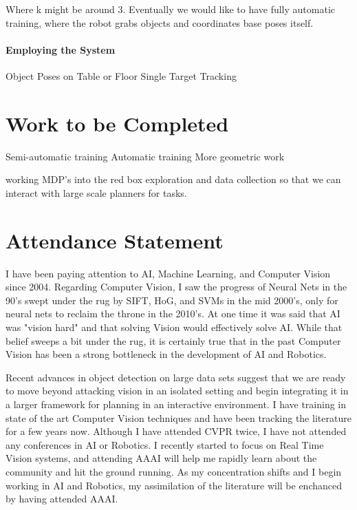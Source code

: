 \documentclass[12pt]{article}
\numberwithin{equation}{section}
\numberwithin{table}{section}
\numberwithin{figure}{section}
\begin{document}
Where k might be around 3. Eventually we would like to have fully automatic training, where the
robot grabs objects and coordinates base poses itself.

\paragraph{Employing the System}
Object Poses on Table or Floor
Single Target Tracking

\section{Work to be Completed}
Semi-automatic training
Automatic training
More geometric work

working MDP's into the red box exploration and data collection so that we can interact with
large scale planners for tasks.


%
%

\newpage

\section{Attendance Statement}
  I have been paying attention to AI, Machine Learning, and Computer Vision since 2004. 
Regarding Computer Vision, I saw the progress of Neural Nets in the 90's swept under 
the rug by SIFT, HoG, and SVMs in the mid 2000's, only for neural nets to reclaim the throne in the 2010's.
At one time it was said that AI was "vision hard" and that solving Vision would
effectively solve AI. While that belief sweeps a bit under the rug, it is certainly true
that in the past Computer Vision has been a strong bottleneck in the development of AI and 
Robotics. 
  
  Recent advances in object detection on large data sets suggest that we are ready
to move beyond attacking vision in an isolated setting and begin integrating it in a
larger framework for planning in an interactive environment. I have training in state
of the art Computer Vision techniques and have been tracking the literature for a few
years now. Although I have attended CVPR twice, I have not attended any conferences in
AI or Robotics.  I recently started to focus on Real Time Vision systems, and attending AAAI
will help me rapidly learn about the community and hit the ground running. As my 
concentration shifts and I begin working in AI and Robotics, my assimilation of the literature
will be enchanced by having attended AAAI.
  
\end{document}

